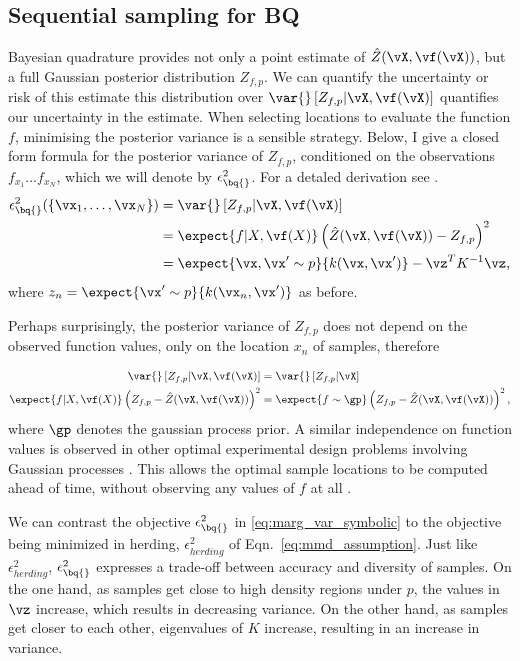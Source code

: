 \subsection{Sequential sampling for BQ}

Bayesian quadrature provides not only a point estimate of $\hat{Z}(\vX,\vf(\vX))$, but a full Gaussian posterior distribution $Z_{f,p}$. We can quantify the uncertainty or risk of this estimate this distribution over $\var{} \left[ Z_{f,p} \vert \vX, \vf(\vX) \right]$ quantifies our uncertainty in the estimate. When selecting locations to evaluate the function $f$, minimising the posterior variance is a sensible strategy. Below, I give a closed form formula for the posterior variance of $Z_{f,p}$, conditioned on the observations $f_{x_1} \dots f_{x_N}$, which we will denote by $\epsilon^2_{\bq{}}$. For a detaled derivation see \citep{BZMonteCarlo}.
\begin{align}
	\epsilon^{2}_{\bq{}}(\{ \vx_1,\ldots,\vx_N \}) &= \var{} \left[ Z_{f,p} \vert \vX, \vf(\vX) \right]\\
	&= \expect{f\vert X,\vf(X)} \left( \hat{Z}(\vX,\vf(\vX)) - Z_{f,p} \right)^2\\
	&= \expect{\vx, \vx' \sim p}{k(\vx, \vx')} - \vz^T K^{-1} \vz\mbox{,}
		\label{eq:marg_var_symbolic}
\end{align}
%
where $z_n = \expect{\vx' \sim p}{k(\vx_n, \vx')}$ as before.

Perhaps surprisingly, the posterior variance of $Z_{f,p}$ does not depend on the observed function values, only on the location $x_n$ of samples, therefore

\begin{align}
	\var{} \left[ Z_{f,p} \vert \vX, \vf(\vX) \right] &= \var{} \left[ Z_{f,p} \vert \vX \right]\\
\expect{f\vert X,\vf(X)} \left( Z_{f,p} - \hat{Z}(\vX,\vf(\vX))  \right)^2 &= \expect{f\sim\gp} \left( Z_{f,p} - \hat{Z}(\vX,\vf(\vX)) \right)^2,\label{eqn:variance_independent}
\end{align}
%
where $\gp$ denotes the gaussian process prior. A similar independence on function values is observed in other optimal experimental design problems involving Gaussian processes \citep{guestrin1}. This allows the optimal sample locations to be computed ahead of time, without observing any values of $f$ at all \citep{minka2000dqr}.

We can contrast the \bq{} objective $\epsilon^{2}_{\bq{}}$ in \eqref{eq:marg_var_symbolic} to the objective being minimized in herding, $\epsilon^{2}_{herding}$ of Eqn.\ \eqref{eq:mmd_assumption}. Just like $\epsilon^{2}_{herding}$, $\epsilon^{2}_{\bq{}}$ expresses a trade-off between accuracy and diversity of samples. On the one hand, as samples get close to high density regions under $p$, the values in $\vz$ increase, which results in decreasing variance. On the other hand, as samples get closer to each other, eigenvalues of $K$ increase, resulting in an increase in variance. 

